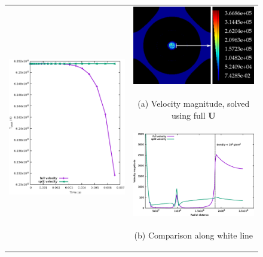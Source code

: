 \begin{figure}[htb]
\begin{center}
\begin{tabular}{l c}
\multirow{4}{3.25in}[30mm]{ \includegraphics[width=3.0in]{./figs/wdconvect_256_splitU} } & \multicolumn{1}{c}{\includegraphics[width=2.35in]{./figs/magvel_full_XY}} \\
& \multicolumn{1}{c}{\begin{footnotesize} (a) Velocity magnitude, solved using full $\mathbf{U}$ \end{footnotesize}} \\[1.em]
& \multicolumn{1}{c}{\includegraphics[width=2.75in]{./figs/magvel_lineout_X}} \\ 
& \multicolumn{1}{c}{\begin{footnotesize} (b) Comparison along white line \end{footnotesize}} \\

\end{tabular}
\end{center}
\end{figure}
